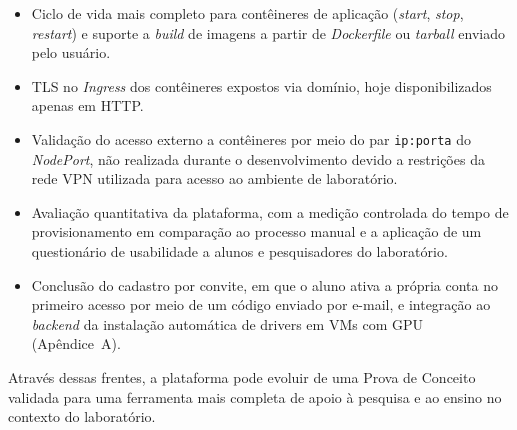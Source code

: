 \begin{itemize}
    \item Ciclo de vida mais completo para contêineres de aplicação (\textit{start}, \textit{stop}, \textit{restart}) e suporte a \textit{build} de imagens a partir de \textit{Dockerfile} ou \textit{tarball} enviado pelo usuário.

    \item TLS no \textit{Ingress} dos contêineres expostos via domínio, hoje disponibilizados apenas em HTTP.

    \item Validação do acesso externo a contêineres por meio do par \texttt{ip:porta} do \textit{NodePort}, não realizada durante o desenvolvimento devido a restrições da rede VPN utilizada para acesso ao ambiente de laboratório.

    \item Avaliação quantitativa da plataforma, com a medição controlada do tempo de provisionamento em comparação ao processo manual e a aplicação de um questionário de usabilidade a alunos e pesquisadores do laboratório.

    \item Conclusão do cadastro por convite, em que o aluno ativa a própria conta no primeiro acesso por meio de um código enviado por e-mail, e integração ao \textit{backend} da instalação automática de drivers em VMs com GPU (Apêndice~A).

\end{itemize}

Através dessas frentes, a plataforma pode evoluir de uma Prova de Conceito validada para uma ferramenta mais completa de apoio à pesquisa e ao ensino no contexto do laboratório.
\clearpage